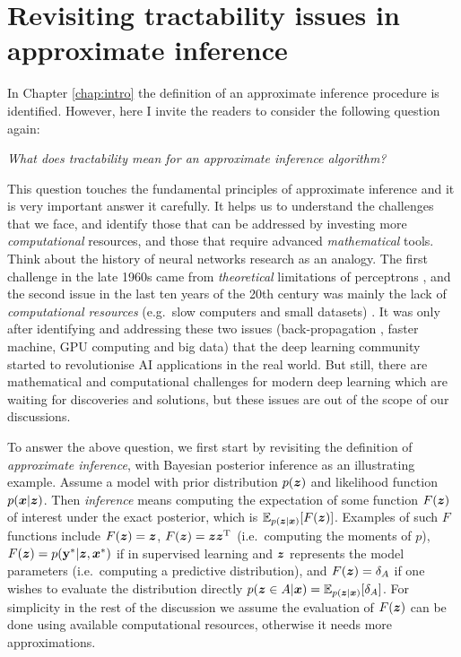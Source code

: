 \section{Revisiting tractability issues in approximate inference}
\label{sec:chap5_wild_concept}

In Chapter \ref{chap:intro} the definition of an approximate inference procedure is identified. However, here I invite the readers to consider the following question again:
\begin{center}
\emph{What does tractability mean for an approximate inference algorithm?}
\end{center}

This question touches the fundamental principles of approximate inference and it is very important answer it carefully. It helps us to understand the challenges that we face, and identify those that can be addressed by investing more \emph{computational} resources, and those that require advanced \emph{mathematical} tools. 
%
Think about the history of neural networks research as an analogy. The first challenge in the late 1960s came from \emph{theoretical} limitations of perceptrons \citep{minsky:perceptrons1969}, and the second issue in the last ten years of the 20th century was mainly the lack of \emph{computational resources} (e.g.~slow computers and small datasets) \citep{lecun:deeplearning2015}. It was only after identifying and addressing these two issues (back-propagation \citep{rumelhart:backprop1986}, faster machine, GPU computing and big data) that the deep learning community started to revolutionise AI applications in the real world. But still, there are mathematical and computational challenges for modern deep learning which are waiting for discoveries and solutions, but these issues are out of the scope of our discussions.

To answer the above question, we first start by revisiting the definition of \emph{approximate inference}, with Bayesian posterior inference as an illustrating example. Assume a model with prior distribution $p(\bm{z})$ and likelihood function $p(\bm{x} | \bm{z})$. Then \emph{inference} means computing the expectation of some function $F(\bm{z})$ of interest under the exact posterior, which is $\mathbb{E}_{p(\bm{z}|\bm{x})} [ F(\bm{z})]$. 
Examples of such $F$ functions include $F(\bm{z}) = \bm{z}$, $F(\bm{z}) = \bm{z} \bm{z}^{\text{T}}$ (i.e.~computing the moments of $p$), $F(\bm{z}) = p(\mathbf{y}^*|\bm{z}, \bm{x}^*)$ if in supervised learning and $\bm{z}$ represents the model parameters (i.e.~computing a predictive distribution), and $F(\bm{z}) = \delta_{A}$ if one wishes to evaluate the distribution directly $p(\bm{z} \in A | \bm{x}) = \mathbb{E}_{p(\bm{z} | \bm{x})}[ \delta_{A} ]$.
%
For simplicity in the rest of the discussion we assume the evaluation of $F(\bm{z})$ can be done using available computational resources, otherwise it needs more approximations.

